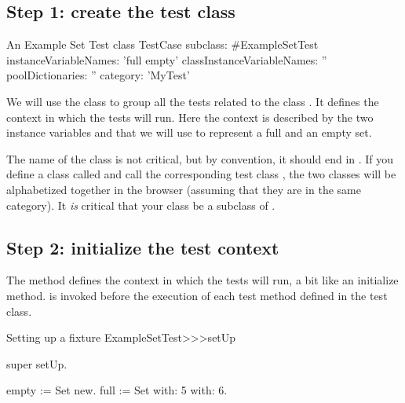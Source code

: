 \documentclass[a4paper,10pt,twoside]{book}
\begin{document}
\subsection{Step 1: create the test class}


\begin{classdef}[exampleSetTest]{An Example Set Test class}
TestCase subclass: #ExampleSetTest
	instanceVariableNames: 'full empty'
	classInstanceVariableNames: ''
    poolDictionaries: ''
	category: 'MyTest'
\end{classdef}


We will use the class  to group all the tests related to the class .
It defines the context in which the tests will run.
Here the context is described by the two instance variables  and  that we will use to represent a full and an empty set.

The name of the class is not critical, but by convention, it should end in .
If you define a class called  and call the corresponding test class , the two classes will be alphabetized together in the browser (assuming that they are in the same category).
It \emph{is} critical that your class be a subclass of .
\subsection{Step 2: initialize the test context}

The method  defines the context in which the tests will run, a bit like an initialize method.
 is invoked before the execution of each test method defined in the test class.


\begin{method}[setupExampleSetTest]{Setting up a fixture}
ExampleSetTest>>>setUp

	super setUp.
	
	empty := Set new.
	full := Set with: 5 with: 6.
\end{method}
\end{document}
